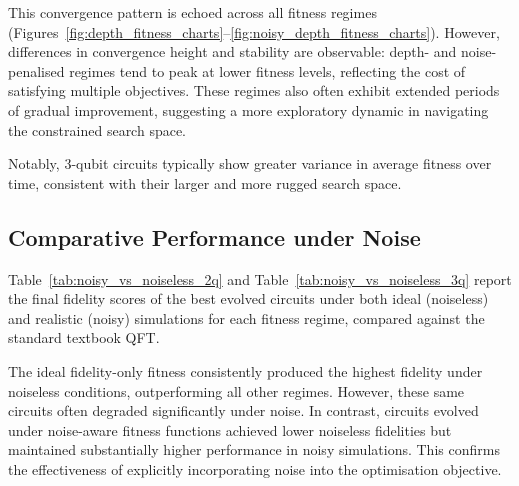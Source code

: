 \documentclass[11pt,a4paper]{article}
\begin{document}
This convergence pattern is echoed across all fitness regimes (Figures~\ref{fig:depth_fitness_charts}–\ref{fig:noisy_depth_fitness_charts}). However, differences in convergence height and stability are observable: depth- and noise-penalised regimes tend to peak at lower fitness levels, reflecting the cost of satisfying multiple objectives. These regimes also often exhibit extended periods of gradual improvement, suggesting a more exploratory dynamic in navigating the constrained search space.\newline

Notably, 3-qubit circuits typically show greater variance in average fitness over time, consistent with their larger and more rugged search space.

\subsection{Comparative Performance under Noise}
Table~\ref{tab:noisy_vs_noiseless_2q} and Table~\ref{tab:noisy_vs_noiseless_3q} report the final fidelity scores of the best evolved circuits under both ideal (noiseless) and realistic (noisy) simulations for each fitness regime, compared against the standard textbook QFT.\newline

The ideal fidelity-only fitness consistently produced the highest fidelity under noiseless conditions, outperforming all other regimes. However, these same circuits often degraded significantly under noise. In contrast, circuits evolved under noise-aware fitness functions achieved lower noiseless fidelities but maintained substantially higher performance in noisy simulations. This confirms the effectiveness of explicitly incorporating noise into the optimisation objective.
\end{document}
